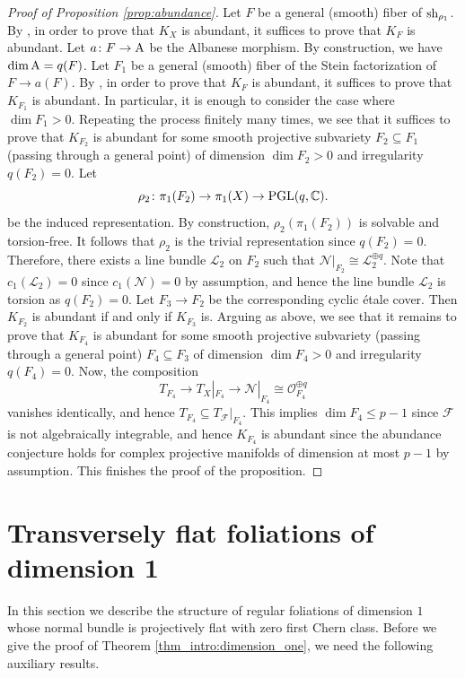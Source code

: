 \documentclass[english,10pt]{amsart}
\renewcommand{\le}{\leqslant}
\newcommand{\cF}{\mathcal{F}}
\newcommand{\sL}{\mathscr{L}}
\newcommand{\sN}{\mathscr{N}}
\newcommand{\sO}{\mathscr{O}}
\theoremstyle{definition}
\theoremstyle{remark}
\numberwithin{equation}{section}
\begin{document}
\begin{proof}[Proof of Proposition \ref{prop:abundance}]
Let $F$ be a general (smooth) fiber of $\textup{sh}_{\rho_1}$. By \cite[Proposition 2.23]{druel_proj_flat}, in order to prove that $K_X$ is abundant, it suffices to prove that $K_F$ is abundant. Let $a \colon F \to \textup{A}$ be the Albanese morphism. By construction, we have $\dim \textup{A} = q(F)$. Let $F_1$ be a general (smooth) fiber of the Stein factorization of $F \to a(F)$. 
By \cite[Theorem 1.1]{hu_log_abundance}, in order to prove that $K_F$ is abundant, it suffices to prove that $K_{F_1}$ is abundant. In particular, it is enough to consider the case where $\dim F_1 >0$. Repeating the process finitely many times, we see that it suffices to prove that $K_{F_2}$ is abundant for some smooth projective subvariety $F_2 \subseteq F_1$ (passing through a general point) of dimension $\dim F_2 >0$ and irregularity $q(F_2)=0$. Let 
\[
\rho_2\colon \pi_1(F_2) \to \pi_1(X) \to \textup{PGL}(q,\mathbb{C}).
\]
be the induced representation. By construction, $\rho_2(\pi_1(F_2))$ is solvable and torsion-free. It follows  that $\rho_2$ is the trivial representation since $q(F_2)=0$. Therefore, there exists a line bundle 
$\sL_2$ on $F_2$ such that $\sN|_{F_2}\cong \sL_2^{\oplus q}$. Note that $c_1(\sL_2)=0$ since $c_1(\sN)=0$ by assumption, and hence the line bundle $\sL_2$ is torsion as $q(F_2)=0$. Let $F_3 \to F_2$ be the corresponding cyclic \'etale cover. Then $K_{F_2}$ is abundant if and only if $K_{F_3}$ is. Arguing as above, we see that it remains to prove that $K_{F_4}$ is abundant for some smooth projective subvariety (passing through a general point) $F_4 \subseteq F_3$ of dimension $\dim F_4 >0$ and irregularity $q(F_4)=0$. Now, the composition 
\[
T_{F_4} \to T_X|_{F_4}\to \sN|_{F_4}\cong \sO_{F_4}^{\oplus q} 
\]
vanishes identically, and hence $T_{F_4} \subseteq T_\cF|_{F_4}$. This implies $\dim F_4 \le p-1$ since $\cF$ is not algebraically integrable, and hence $K_{F_4}$ is abundant since the abundance conjecture holds for complex projective manifolds of dimension at most $p-1$ by assumption. This finishes the proof of the proposition.
\end{proof}

\section{Transversely flat foliations of dimension 1}\label{dimension_one}

In this section we describe the structure of regular foliations of dimension $1$ whose normal bundle is projectively flat with zero first Chern class. Before we give the proof of Theorem \ref{thm_intro:dimension_one}, we need the following auxiliary results.
\end{document}
